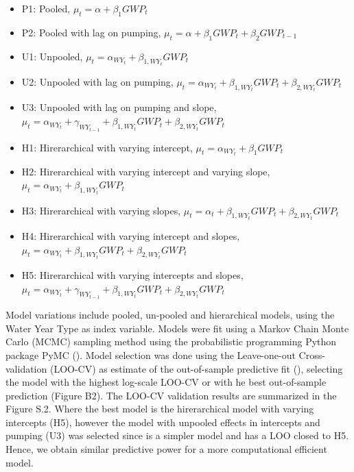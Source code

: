 \documentclass[11pt,a4paper]{article}
\begin{document}
\begin{itemize}[noitemsep,topsep=4pt]
  \item P1: Pooled,   $\mu_t = \alpha + \beta_{1}GWP_{t}$
  \item P2: Pooled with lag on pumping,   $\mu_t = \alpha + \beta_{1}GWP_{t} + \beta_{2}GWP_{t-1} $
  \item U1: Unpooled, $\mu_t = \alpha_{WY_{t}} + \beta_{1,WY_{t}}GWP_{t}$
  \item U2: Unpooled with lag on pumping, $\mu_t = \alpha_{WY_{t}} + \beta_{1,WY_{t}}GWP_{t} + \beta_{2,WY_{t}}GWP_{t} $
  \item U3: Unpooled with lag on pumping and slope, $\mu_t =  \alpha_{WY_{t}} + \gamma_{WY_{t-1}} + \beta_{1,WY_{t}}GWP_{t} + \beta_{2,WY_{t}}GWP_{t}$
  \item H1: Hirerarchical with varying intercept, $\mu_t = \alpha_{WY_{t}} + \beta_{1}GWP_{t}$
  \item H2: Hirerarchical with varying intercept and varying slope, $\mu_t = \alpha_{WY_{t}} + \beta_{1,WY_{t}}GWP_{t}$
  \item H3: Hirerarchical with varying slopes, $\mu_t = \alpha_t + \beta_{1,WY_{t}}GWP_{t} + \beta_{2,WY_{t}}GWP_{t}$
  \item H4: Hirerarchical with varying intercept and slopes, $\mu_t = \alpha_{WY_{t}} + \beta_{1,WY_{t}}GWP_{t} + \beta_{2,WY_{t}}GWP_{t}$
  \item H5: Hirerarchical with varying intercepts and slopes, $\mu_t = \alpha_{WY_{t}} + \gamma_{WY_{t-1}} + \beta_{1,WY_{t}}GWP_{t} + \beta_{2,WY_{t}}GWP_{t}$
\end{itemize}

Model variations include pooled, un-pooled and hierarchical models, using the Water Year Type as index variable. Models were fit using a Markov Chain Monte Carlo (MCMC) sampling method using the probabilistic programming Python package PyMC (\cite{salvatier_probabilistic_2016}). Model selection was done using the Leave-one-out Cross-validation (LOO-CV) as estimate of the out-of-sample predictive fit (\cite{vehtari_practical_2017}), selecting the model with the highest log-scale LOO-CV or with he best out-of-sample prediction (Figure B2). The LOO-CV validation results are summarized in the Figure S.2. Where the best model is the hirerarchical model with varying intercepts (H5), however the model with unpooled effects in intercepts and pumping (U3) was selected since is a simpler model and has a LOO closed to H5. Hence, we obtain similar predictive power for a more computational efficient model. 
\end{document}
